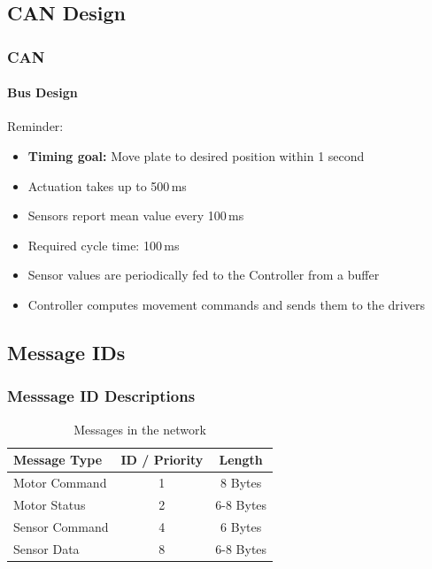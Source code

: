 \documentclass{beamer}
\begin{document}
\subsection{CAN Design}
\begin{frame}
  \frametitle{CAN}
  \framesubtitle{Bus Design}
	Reminder:
	\begin{itemize}
		\item \textbf{Timing goal:} Move plate to desired position within 1 second
		\item Actuation takes up to 500\,ms
		\item Sensors report mean value every 100\,ms
	\end{itemize}
	\vfill
  \begin{itemize}
    \item Required cycle time: 100\,ms
    \item Sensor values are periodically fed to the Controller from a buffer
    \item Controller computes movement commands and sends them to the drivers
  \end{itemize}
\end{frame}

\subsection{Message IDs}
\begin{frame}
  \frametitle{Messsage ID Descriptions}
  \begin{table}
\begin{tabular}{l | c | c }
Message Type & ID / Priority & Length \\
\hline \hline
Motor Command & 1 & 8 Bytes\\
Motor Status & 2 & 6-8 Bytes \\
Sensor Command & 4 & 6 Bytes \\
Sensor Data & 8 & 6-8 Bytes
\end{tabular}
\caption{Messages in the network}
\end{table}
\end{frame}
\end{document}

